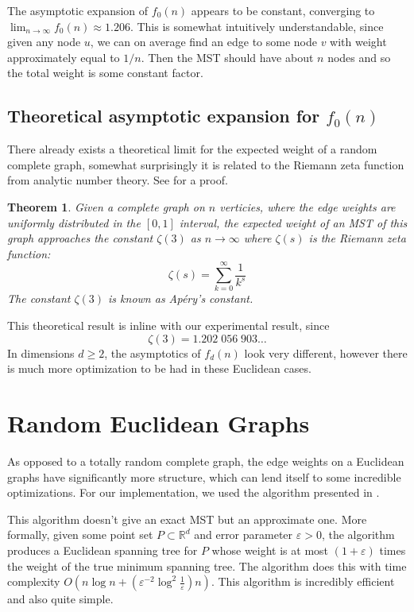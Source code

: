 \documentclass[a4paper, 10pt, twocolumn, twoside]{article}
\newtheorem{theorem}{Theorem}
\begin{document}
The asymptotic expansion of $f_0(n)$ appears to be constant, converging to $\lim_{n\to \infty} f_0(n)\approx 1.206$. This is somewhat intuitively understandable, since given any node $u$, we can on average find an edge to some node $v$ with weight approximately equal to $1 /n$. Then the MST should have about $n$ nodes and so the total weight is some constant factor.

\subsection{Theoretical asymptotic expansion for $f_{0}(n)$}

There already exists a theoretical limit for the expected weight of a random complete graph, somewhat surprisingly it is related to the Riemann zeta function from analytic number theory. See \cite{Fr1985} for a proof.

\begin{theorem}
    Given a complete graph on $n$ verticies, where the edge weights are uniformly distributed in the $[0,1]$ interval, the expected weight of an MST of this graph approaches the constant $\zeta(3)$ as $n\to \infty$ where $\zeta(s)$ is the Riemann zeta function:
    \[
        \zeta(s)=\sum^\infty_{k=0}\frac{1}{k^s}
    \]
    The constant $\zeta(3)$ is known as Apéry's constant.
\end{theorem}

This theoretical result is inline with our experimental result, since
\[
    \zeta(3)=1.202\;056\;903\ldots
\]  
In dimensions $d\geq 2$, the asymptotics of $f_d(n)$ look very different, however there is much more optimization to be had in these Euclidean cases.

\section{Random Euclidean Graphs}

As opposed to a totally random complete graph, the edge weights on a Euclidean graphs have significantly more structure, which can lend itself to some incredible optimizations. For our implementation, we used the algorithm presented in \cite{SD2016}. 

This algorithm doesn't give an exact MST but an approximate one. More formally, given some point set $P\subset \mathbb{R}^d$ and error parameter $\varepsilon > 0$, the algorithm produces a Euclidean spanning tree for $P$ whose weight is at most $(1+\varepsilon)$ times the weight of the true minimum spanning tree. The algorithm does this with time complexity $O\left(n\log n + \left(\varepsilon^{-2}\log^2 \frac{1}{\varepsilon}\right)n\right)$. This algorithm is incredibly efficient and also quite simple.
\end{document}
